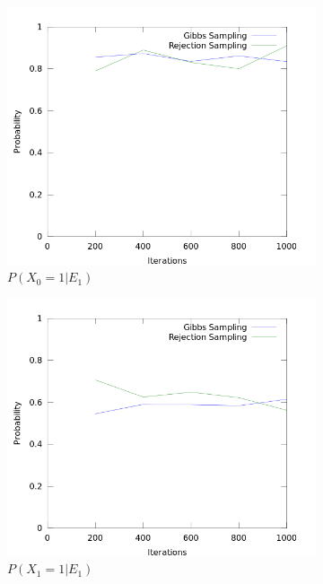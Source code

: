 \documentclass[11pt]{article}
\begin{document}
\begin{figure}
\centering
\begin{subfigure}[b]{0.49\textwidth}
	\includegraphics[width=\textwidth]{ian1.png}
	\caption{$P(X_0=1 | E_1) $}
	\end{subfigure}
\begin{subfigure}[b]{0.49\textwidth}
	\includegraphics[width=\textwidth]{ian2.png}
	\caption{$P(X_1=1 | E_1) $}
\end{subfigure}
\begin{subfigure}[b]{0.49\textwidth}

\end{subfigure}
\end{figure}
\end{document}
